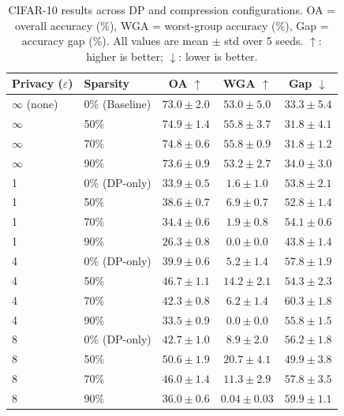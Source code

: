 \documentclass{article}
\begin{document}
\begin{table}[t]
\caption{CIFAR-10 results across DP and compression configurations. OA = overall accuracy (\%), WGA = worst-group accuracy (\%), Gap = accuracy gap (\%). All values are mean $\pm$ std over 5 seeds. $\uparrow$: higher is better; $\downarrow$: lower is better.}
\label{tab:cifar10_main}
\centering
\small
\begin{tabular}{llccc}
\toprule
Privacy ($\varepsilon$) & Sparsity & OA $\uparrow$ & WGA $\uparrow$ & Gap $\downarrow$ \\
\midrule
$\infty$ (none) & 0\% (Baseline) & $73.0 \pm 2.0$ & $53.0 \pm 5.0$ & $33.3 \pm 5.4$ \\
\midrule
$\infty$ & 50\% & $74.9 \pm 1.4$ & $55.8 \pm 3.7$ & $31.8 \pm 4.1$ \\
$\infty$ & 70\% & $74.8 \pm 0.6$ & $55.8 \pm 0.9$ & $31.8 \pm 1.2$ \\
$\infty$ & 90\% & $73.6 \pm 0.9$ & $53.2 \pm 2.7$ & $34.0 \pm 3.0$ \\
\midrule
1 & 0\% (DP-only) & $33.9 \pm 0.5$ & $1.6 \pm 1.0$ & $53.8 \pm 2.1$ \\
1 & 50\% & $38.6 \pm 0.7$ & $6.9 \pm 0.7$ & $52.8 \pm 1.4$ \\
1 & 70\% & $34.4 \pm 0.6$ & $1.9 \pm 0.8$ & $54.1 \pm 0.6$ \\
1 & 90\% & $26.3 \pm 0.8$ & $0.0 \pm 0.0$ & $43.8 \pm 1.4$ \\
\midrule
4 & 0\% (DP-only) & $39.9 \pm 0.6$ & $5.2 \pm 1.4$ & $57.8 \pm 1.9$ \\
4 & 50\% & $46.7 \pm 1.1$ & $14.2 \pm 2.1$ & $54.3 \pm 2.3$ \\
4 & 70\% & $42.3 \pm 0.8$ & $6.2 \pm 1.4$ & $60.3 \pm 1.8$ \\
4 & 90\% & $33.5 \pm 0.9$ & $0.0 \pm 0.0$ & $55.8 \pm 1.5$ \\
\midrule
8 & 0\% (DP-only) & $42.7 \pm 1.0$ & $8.9 \pm 2.0$ & $56.2 \pm 1.8$ \\
8 & 50\% & $50.6 \pm 1.9$ & $20.7 \pm 4.1$ & $49.9 \pm 3.8$ \\
8 & 70\% & $46.0 \pm 1.4$ & $11.3 \pm 2.9$ & $57.8 \pm 3.5$ \\
8 & 90\% & $36.0 \pm 0.6$ & $0.04 \pm 0.03$ & $59.9 \pm 1.1$ \\
\bottomrule
\end{tabular}
\end{table}
\end{document}
